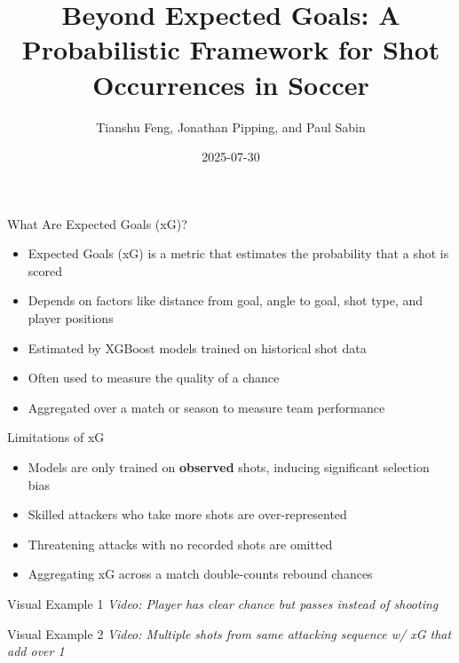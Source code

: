 \documentclass[
  11pt,
  ignorenonframetext,
]{beamer}
\title[Beyond Expected Goals]{Beyond Expected Goals: A Probabilistic
Framework for Shot Occurrences in Soccer}
\author[Feng, T., Pipping, J., \& Sabin, P.]{Tianshu Feng, Jonathan
Pipping, and Paul Sabin}
\date{2025-07-30}
\institute[UPenn]{University of Pennsylvania}
\providecommand{\tightlist}{%
  \setlength{\itemsep}{0pt}\setlength{\parskip}{0pt}}
\begin{document}
\frame{\titlepage}

\begin{frame}{What Are Expected Goals (xG)?}
\protect{}\label{what-are-expected-goals-xg}
\begin{itemize}
\tightlist
\item
  Expected Goals (xG) is a metric that estimates the probability that a
  shot is scored
\item
  Depends on factors like distance from goal, angle to goal, shot type,
  and player positions
\item
  Estimated by XGBoost models trained on historical shot data
\item
  Often used to measure the quality of a chance
\item
  Aggregated over a match or season to measure team performance
\end{itemize}
\end{frame}

\begin{frame}{Limitations of xG}
\protect{}\label{limitations-of-xg}
\begin{itemize}
\tightlist
\item
  Models are only trained on \textbf{observed} shots, inducing
  significant selection bias
\item
  Skilled attackers who take more shots are over-represented
\item
  Threatening attacks with no recorded shots are omitted
\item
  Aggregating xG across a match double-counts rebound chances
\end{itemize}
\end{frame}

\begin{frame}{Visual Example 1}
\protect{}\label{visual-example-1}
\emph{Video: Player has clear chance but passes instead of shooting}
\end{frame}

\begin{frame}{Visual Example 2}
\protect{}\label{visual-example-2}
\emph{Video: Multiple shots from same attacking sequence w/ xG that add
over 1}
\end{frame}
\end{document}
